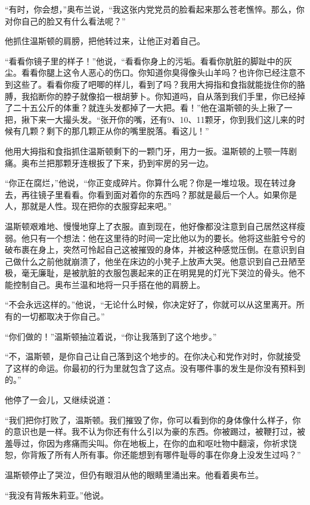 ``有时，你会想，''奥布兰说，``我这张内党党员的脸看起来那么苍老憔悴。那么，你对你自己的脸又有什么看法呢？''

他抓住温斯顿的肩膀，把他转过来，让他正对着自己。

``看看你镜子里的样子！''他说，``看看你身上的污垢。看看你肮脏的脚趾中的灰尘。看看你腿上这令人恶心的伤口。你知道你臭得像头山羊吗？也许你已经注意不到这些了。看看你瘦了吧唧的样儿，看到了吗？我用大拇指和食指就能拢住你的胳膊，我掐断你的脖子就像掐一根胡萝卜。你知道吗，自从落到我们手里，你已经掉了二十五公斤的体重？就连头发都掉了一大把。看！''他在温斯顿的头上揪了一把，揪下来一大撮头发。``张开你的嘴，还有9、10、11颗牙，你到我们这儿来的时候有几颗？剩下的那几颗正从你的嘴里脱落。看这儿！''

他用大拇指和食指抓住温斯顿剩下的一颗门牙，用力一扳。温斯顿的上颚一阵剧痛。奥布兰把那颗牙连根扳了下来，扔到牢房的另一边。

``你正在腐烂，''他说，``你正变成碎片。你算什么呢？你是一堆垃圾。现在转过身去，再往镜子里看看。你看到面对着你的东西吗？那就是最后一个人。如果你是人，那就是人性。现在把你的衣服穿起来吧。''

温斯顿艰难地、慢慢地穿上了衣服。直到现在，他好像都没注意到自己居然这样瘦弱。他只有一个想法：他在这里待的时间一定比他以为的要长。他将这些脏兮兮的破布裹在身上，突然可怜起自己这被摧毁的身体，并被这种感觉压倒。在意识到自己做什么之前他就崩溃了，他坐在床边的小凳子上放声大哭。他意识到自己丑陋至极，毫无廉耻，是被肮脏的衣服包裹起来的正在明晃晃的灯光下哭泣的骨头。他不能控制自己。奥布兰温和地将一只手搭在他的肩膀上。

``不会永远这样的。''他说，``无论什么时候，你决定好了，你就可以从这里离开。所有的一切都取决于你自己。''

``你们做的！''温斯顿抽泣着说，``你让我落到了这个地步。''

``不，温斯顿，是你自己让自己落到这个地步的。在你决心和党作对时，你就接受了这样的命运。你最初的行为里就包含了这点。没有哪件事的发生是你没有预料到的。''

他停了一会儿，又继续说道：

``我们把你打败了，温斯顿。我们摧毁了你，你可以看到你的身体像什么样子，你的意识也是一样。我不认为你还有什么引以为豪的东西。你被踢过，被鞭打过，被羞辱过，你因为疼痛而尖叫。你在地板上，在你的血和呕吐物中翻滚，你祈求饶恕，你背叛了所有人所有事。你还能想到有哪件耻辱的事在你身上没发生过吗？''

温斯顿停止了哭泣，但仍有眼泪从他的眼睛里涌出来。他看着奥布兰。

``我没有背叛朱莉亚。''他说。

